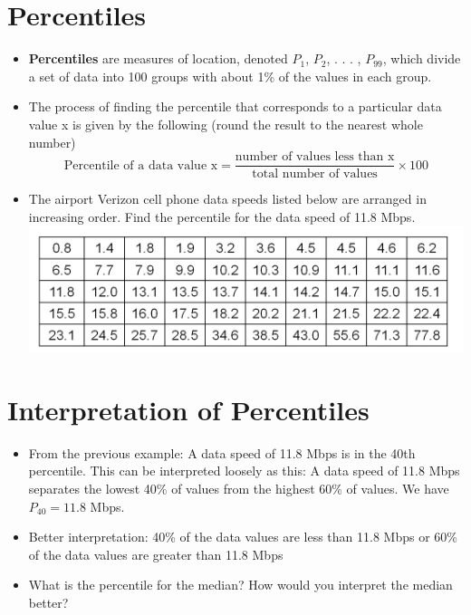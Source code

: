 \documentclass[]{book}
\providecommand{\tightlist}{%
  \setlength{\itemsep}{0pt}\setlength{\parskip}{0pt}}
\begin{document}
\hypertarget{percentiles}{%
\section{Percentiles}\label{percentiles}}

\begin{itemize}
\tightlist
\item
  \textbf{Percentiles} are measures of location, denoted \(P_1\), \(P_2\), . . . , \(P_99\), which divide a set of data into 100 groups with about 1\% of the values in each group.
\item
  The process of finding the percentile that corresponds to a particular data value x is given by the following (round the result to the nearest whole number)
  \[\textrm{Percentile of a data value x}=\frac{\textrm{number of values less than x}}{\textrm{total number of values}}\times 100\]
\item
  The airport Verizon cell phone data speeds listed below are arranged in increasing order. Find the percentile for the data speed of 11.8 Mbps.
  \includegraphics{pic13.png}
\end{itemize}

\hypertarget{interpretation-of-percentiles}{%
\section{Interpretation of Percentiles}\label{interpretation-of-percentiles}}

\begin{itemize}
\tightlist
\item
  From the previous example: A data speed of 11.8 Mbps is in the 40th percentile. This can be interpreted loosely as this:
  A data speed of 11.8 Mbps separates the lowest 40\% of values from the highest 60\% of values. We have \(P_{40} = 11.8\) Mbps.
\item
  Better interpretation: 40\% of the data values are less than 11.8 Mbps or 60\% of the data values are greater than 11.8 Mbps
\item
  What is the percentile for the median? How would you interpret the median better?
\end{itemize}
\end{document}
